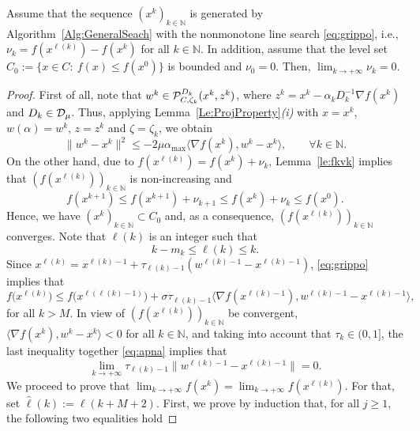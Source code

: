 \begin{proposition} \label{pr;gripponuo}
	Assume that the sequence  $(x^k)_{k\in\mathbb{N}}$ is generated by Algorithm~\ref{Alg:GeneralSeach} with the  nonmonotone line  search \eqref{eq:grippo}, i.e.,  $\nu_{k}= f(x^{\ell(k)})-f(x^k)$ for all  $k \in \mathbb{N}$. In addition,  assume that the level set $C_{0}:=\{ x\in C: ~ f(x)\leq f(x^0) \}$ is bounded and $\nu_0= 0$.  Then, $\lim_{k\to +\infty} \nu_{k} = 0$.
\end{proposition}
\begin{proof}
	First of all, note that     $w^k \in   {\cal P}_{C,\zeta_k}^{D_k}(x^{k}, z^k)$,  where $z^k = x^{k}-\alpha_k D^{-1} _k\nabla f(x^{k})$ and $D_k\in {\cal D}_{\mu}$. Thus,  applying Lemma~\ref{Le:ProjProperty}{\it (i)}  with $x=x^k$, $w(\alpha) = w^k$, $z = z^k$ and $\zeta= \zeta_k$, we obtain
	\begin{equation}\label{eq:apna}
		\|w^k-x^k\|^2\leq -2\mu \alpha_{\max}\langle \nabla f(x^{k}), w^k-x^{k}\rangle, \qquad \forall k \in \mathbb{N}.
	\end{equation}
	On the other hand, due to   $f(x^{\ell(k)})= f(x^k)+ \nu_{k}$,  Lemma~\ref{le:fkvk} implies that    $(f(x^{\ell(k)}))_{k\in\mathbb{N}}$ is    non-increasing and
	$$
		f(x^{k+1})\leq   f(x^{k+1})+\nu_{k+1}\leq f(x^{k})+\nu_{k}\leq  f(x^{0}).
	$$
	Hence, we have  $(x^k)_{k\in\mathbb{N}}\subset C_{0}$ and, as a consequence,    $(f(x^{\ell(k)}))_{k\in\mathbb{N}}$ converges. Note that $\ell(k)$   is an integer such that
	\begin{equation}\label{eq:lk}
		k-m_k\leq \ell(k)\leq k.
	\end{equation}
	Since $x^{{\ell(k)}}=x^{{\ell(k)}-1}+ \tau_{{\ell(k)}-1} (w^{{\ell(k)}-1} - x^{{\ell(k)} -1})$,  \eqref{eq:grippo}  implies that
	$$
		f\big(x^{\ell(k)}\big)  \leq f\big(x^{\ell({{\ell(k)}-1})}\big)+ \sigma \tau_{{\ell(k)}-1}\big\langle \nabla f(x^{{\ell(k)}-1}), w^{{\ell(k)}-1} - x^{{\ell(k)}-1} \big\rangle,
	$$
	for all $k>M$.  In view of   $(f(x^{\ell(k)}))_{k\in\mathbb{N}}$  be convergent, $\langle \nabla f(x^{k}), w^k - x^{k} \rangle<0$ for all  $k \in \mathbb{N}$, and taking into account that   $\tau_k  \in (0, 1]$,  the last inequality together \eqref{eq:apna} implies that
	\begin{equation}\label{eq:apcss}
		\lim_{k\to +\infty} \tau_{{\ell(k)}-1}\|w^{{\ell(k)}-1}-x^{{\ell(k)}-1}\|=0.
	\end{equation}
	We proceed to  prove that  $\lim_{k\to +\infty} f(x^{k})= \lim_{k\to +\infty} f(x^{\ell(k)})$. For that, set ${\hat \ell}(k):=\ell(k+M+2)$. First, we prove by induction that, for all  $j\geq 1$,  the following two equalities  hold

\end{proof}
